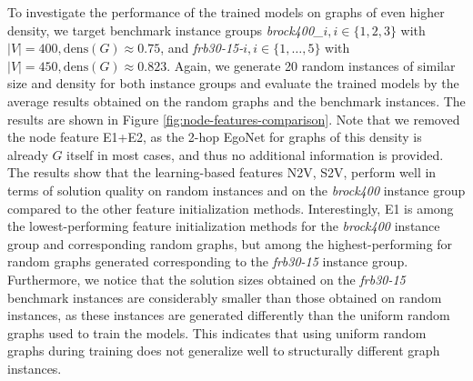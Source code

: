 \documentclass[draft,final]{vutinfth} %
\begin{document}
To investigate the performance of the trained models on graphs of even higher density, we target benchmark instance groups \emph{brock400\_}$i, i \in \{1,2,3\}$ with $|V| = 400, \mathrm{dens}(G) \approx 0.75$, and \emph{frb30-15-}$i, i \in \{1, \dots, 5\}$ with $|V| = 450, \mathrm{dens}(G) \approx 0.823$. 
Again, we generate 20 random instances of similar size and density for both instance groups and evaluate the trained models by the average results obtained on the random graphs and the benchmark instances. The results are shown in Figure \ref{fig:node-features-comparison}. 
Note that we removed the node feature E1+E2, as the 2-hop EgoNet for graphs of this density is already $G$ itself in most cases, and thus no additional information is provided. 
The results show that the learning-based features N2V, S2V, perform well in terms of solution quality on random instances and on the \emph{brock400} instance group compared to the other feature initialization methods. Interestingly, E1 is among the lowest-performing feature initialization methods for the \emph{brock400} instance group and corresponding random graphs, but among the highest-performing for random graphs generated corresponding to the \emph{frb30-15} instance group. Furthermore, we notice that the solution sizes obtained on the \emph{frb30-15} benchmark instances are considerably smaller than those obtained on random instances, as these instances are generated differently than the uniform random graphs used to train the models. This indicates that using uniform random graphs during training does not generalize well to structurally different graph instances. 
\end{document}

